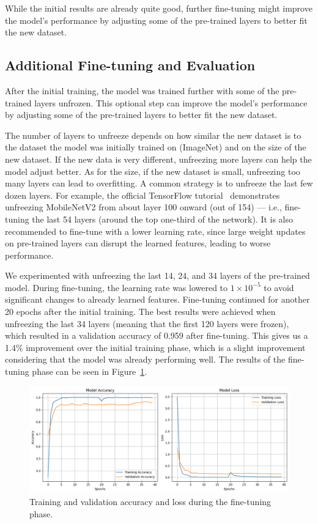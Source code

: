 While the initial results are already quite good, further fine-tuning might improve the model's performance by adjusting some of the pre-trained layers to better fit the new dataset.

\subsection{Additional Fine-tuning and Evaluation}

After the initial training, the model was trained further with some of the pre-trained layers unfrozen. This optional step can improve the model's performance by adjusting some of the pre-trained layers to better fit the new dataset.

The number of layers to unfreeze depends on how similar the new dataset is to the dataset the model was initially trained on (ImageNet) and on the size of the new dataset. If the new data is very different, unfreezing more layers can help the model adjust better. As for the size, if the new dataset is small, unfreezing too many layers can lead to overfitting. A common strategy is to unfreeze the last few dozen layers. For example, the official TensorFlow tutorial~\cite{tensorflow_transfer_learning} demonstrates unfreezing MobileNetV2 from about layer 100 onward (out of 154) --- i.e., fine-tuning the last 54 layers (around the top one-third of the network). It is also recommended to fine-tune with a lower learning rate, since large weight updates on pre-trained layers can disrupt the learned features, leading to worse performance.

We experimented with unfreezing the last 14, 24, and 34 layers of the pre-trained model. During fine-tuning, the learning rate was lowered to \(1 \times 10^{-5}\) to avoid significant changes to already learned features. Fine-tuning continued for another 20 epochs after the initial training. The best results were achieved when unfreezing the last 34 layers (meaning that the first 120 layers were frozen), which resulted in a validation accuracy of 0.959 after fine-tuning. This gives us a 1.4\% improvement over the initial training phase, which is a slight improvement considering that the model was already performing well. The results of the fine-tuning phase can be seen in Figure~\ref{fig:fine_tuning}.

\begin{figure}[h]
    \centering
    \includegraphics[width=1.0\textwidth]{img/fine-tuning.png}
    \caption{Training and validation accuracy and loss during the fine-tuning phase.}\label{fig:fine_tuning}
\end{figure}

